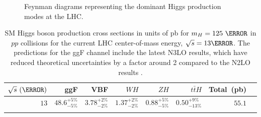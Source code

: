 \begin{figure}[!htbp]
{{\begin{tikzpicture}[thick]
\end{tikzpicture}
}}

\caption{Feynman diagrams representing the dominant Higgs production modes at
the LHC.}

\label{fig:higgs_production}
\end{figure}

\begin{table}[htpb]
 \centering
 \caption{ SM Higgs boson production cross sections in units of pb for
$m_{H}=125~\GeV$ in $pp$ collisions for the current LHC center-of-mass energy,
$\sqrt{s} = 13\TeV$.  The predictions for the ggF channel include the latest
N3LO results, which have reduced theoretical uncertainties by a factor around 2
compared to the N2LO results \cite{PDG2018:Ch11}.}
 \begin{tabular}{@{}rrrrrrrr@{}} \toprule
  $\sqrt{s}~(\TeV)$ & ggF                  & VBF                  & $WH$                 & $ZH$                 & $t\bar{t}H$            & Total~(pb) \\ \midrule
  \addlinespace[0.3em]
  $13$              & $48.6_{-5\%}^{+5\%}$ & $3.78_{-2\%}^{+2\%}$ & $1.37_{-2\%}^{+2\%}$ & $0.88_{-5\%}^{+5\%}$ & $0.50_{-13\%}^{+9\%}$ &  $55.1$    \\
  \addlinespace[0.3em]
  \bottomrule
 \end{tabular}\label{table:higgs_production_xsection}
\end{table}

